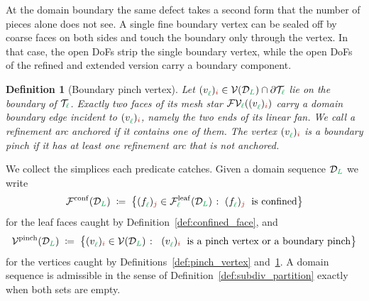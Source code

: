 \documentclass[a4paper, 12pt]{article}
\makeatletter
\newcommand{\guidance}[1]{{\color{lime!70!black} #1}}
\newcommand{\green}{\color{ForestGreen}}
\newcommand{\brickred}{\color{BrickRed}}
\newcommand{\T}{\mathcal{T}}
\newcommand{\V}{\mathcal{V}}
\newcommand{\F}{\mathcal{F}}
\newcommand{\vertex}[2]{\freeQ{v}{}{#1}{#2}}
\newcommand{\face}[2]{\freeQ{f}{}{#1}{#2}}
\newcommand{\FVl}[1]{\F\V_{#1}}
\newcommand{\coarseIdxone}{{\brickred i}}
\newcommand{\fineIdxone}{{\brickred j}}
\renewcommand{\l}{{\green\ell}}
\renewcommand{\L}{{\green L}}
\newcommand{\freeQ}[4]{ ( {#1}^{#2}_{#3} )_{#4}}
\newtheorem{definition}[theorem]{Definition}
\theoremstyle{definition}
\theoremstyle{plain}
\numberwithin{equation}{section}
\newcommand{\prose}[1]{{\color{magenta} #1}}   %
\DeclareRobustCommand{\domseq}[1][]{\mathcal{D}\ifx\@empty#1\@empty\else_{#1}\fi}
\newcommand{\leafF}[1]{\F^{\mathrm{leaf}}_{#1}}             %
\makeatother
\begin{document}
At the domain boundary the same defect takes a second form that the number of pieces alone does not see. A single fine boundary vertex can be sealed off by coarse faces on both sides and touch the boundary only through the vertex. In that case, the open DoFs strip the single boundary vertex, while the open DoFs of the refined and extended version carry a boundary component.

\begin{definition}[Boundary pinch vertex]
    \label{def:boundary_pinch}
    Let $\vertex{\l}{\coarseIdxone} \in \V(\domseq[\L]) \cap \partial\T_\l$ lie on the boundary of $\T_\l$. \guidance{Exactly two faces of its mesh star $\FVl{\l}(\vertex{\l}{\coarseIdxone})$ carry a domain boundary edge incident to $\vertex{\l}{\coarseIdxone}$, namely the two ends of its linear fan. We call a refinement arc \emph{anchored} if it contains one of them.} The vertex $\vertex{\l}{\coarseIdxone}$ is a \emph{boundary pinch} if it has at least one refinement arc that is not anchored.
\end{definition}

\prose{We collect the simplices each predicate catches. Given a domain sequence $\domseq[\L]$ we write
\begin{equation}
    \label{eq:confined_set}
    \F^{\mathrm{conf}}(\domseq[\L]) \; \coloneq \; \big\{ \face{\l}{\fineIdxone} \in \leafF{\l}(\domseq[\L]) \; \colon \; \face{\l}{\fineIdxone} \text{\; is confined} \big\}
\end{equation}
for the leaf faces caught by Definition~\ref{def:confined_face}, and
\begin{equation}
    \label{eq:pinch_set}
    \V^{\mathrm{pinch}}(\domseq[\L]) \; \coloneq \; \big\{ \vertex{\l}{\coarseIdxone} \in \V(\domseq[\L]) \; \colon \;\; \vertex{\l}{\coarseIdxone} \;\text{ is a pinch vertex or a boundary pinch} \big\}
\end{equation}
for the vertices caught by Definitions~\ref{def:pinch_vertex} and~\ref{def:boundary_pinch}. A domain sequence is admissible in the sense of Definition~\ref{def:subdiv_partition} exactly when both sets are empty.}
\end{document}
